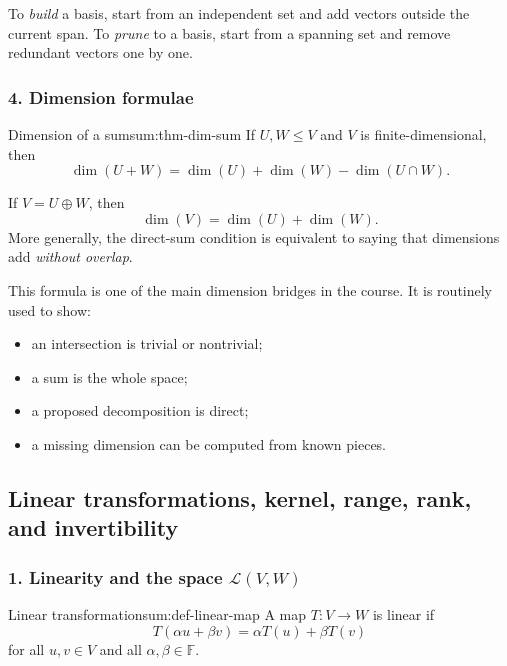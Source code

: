 \begin{examtip}[title={Exam Focus: the two standard basis constructions}]
To \emph{build} a basis, start from an independent set and add vectors outside the current span.  
To \emph{prune} to a basis, start from a spanning set and remove redundant vectors one by one.
\end{examtip}

\subsubsection*{4. Dimension formulae}

\begin{theorem}{Dimension of a sum}{sum:thm-dim-sum}
If \(U,W\le V\) and \(V\) is finite-dimensional, then
\[
\dim(U+W)=\dim(U)+\dim(W)-\dim(U\cap W).
\]
\end{theorem}

\begin{keyformula}[title={Key Formula: direct sums and dimensions}]
If \(V=U\oplus W\), then
\[
\dim(V)=\dim(U)+\dim(W).
\]
More generally, the direct-sum condition is equivalent to saying that dimensions add \emph{without overlap}.
\end{keyformula}

This formula is one of the main dimension bridges in the course. It is routinely used to show:
\begin{itemize}[leftmargin=*]
    \item an intersection is trivial or nontrivial;
    \item a sum is the whole space;
    \item a proposed decomposition is direct;
    \item a missing dimension can be computed from known pieces.
\end{itemize}

\subsection{Linear transformations, kernel, range, rank, and invertibility}

\subsubsection*{1. Linearity and the space \(\mathcal{L}(V,W)\)}

\begin{definition}{Linear transformation}{sum:def-linear-map}
A map \(T:V\to W\) is linear if
\[
T(\alpha u+\beta v)=\alpha T(u)+\beta T(v)
\]
for all \(u,v\in V\) and all \(\alpha,\beta\in\mathbb{F}\).
\end{definition}

